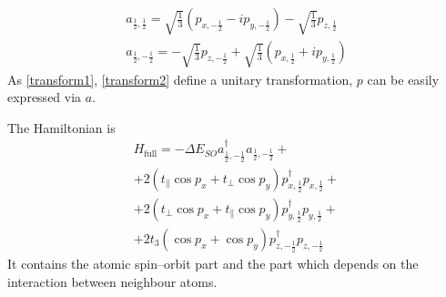 \begin{equation}
	\label{transform2}
	\begin{gathered}
		a_{\frac{1}{2}, \frac{1}{2}} = 
			\sqrt{\frac{1}{3}}\left(p_{x, -\frac{1}{2}} - ip_{y,-\frac{1}{2}}\right) - 
				\sqrt{\frac{1}{3}} p_{z,\frac{1}{2}}\\
		a_{\frac{1}{2}, -\frac{1}{2}} = 
			-\sqrt{\frac{1}{3}} p_{z,-\frac{1}{2}} + 
				\sqrt{\frac{1}{3}}\left(p_{x, \frac{1}{2}} + ip_{y,\frac{1}{2}}\right)
	\end{gathered}
\end{equation}
As \eqref{transform1}, \eqref{transform2} define a unitary transformation, $p$ can be easily
expressed via $a$.

The Hamiltonian is
\begin{multline}
	H_{\mathrm{full}} = -\Delta E_{SO} 
			a_{\frac{1}{2}, -\frac{1}{2}}^\dagger a_{\frac{1}{2}, -\frac{1}{2}}
			+\\
			+2 (t_{\parallel} \cos{p_x} + t_{\perp} \cos{p_y})
				p_{x,\frac 12}^\dagger p_{x,\frac 12}+\\
			+2(t_{\perp} \cos{p_x} + t_{\parallel} \cos{p_y})
				p_{y,\frac 12}^\dagger p_{y,\frac 12} +\\
			+2t_{3}( \cos{p_x} + \cos{p_y})
				p_{z,-\frac 12}^\dagger p_{z,-\frac 12} 
\end{multline}
It contains the atomic spin--orbit part and the part which depends on the interaction between
neighbour atoms.

